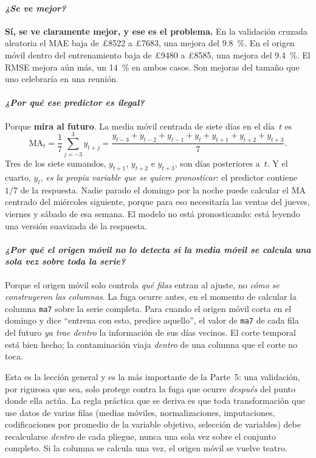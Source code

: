 \documentclass[11pt]{article}
\newcommand{\gbp}{\pounds}
\begin{document}
\paragraph{{\normalfont\itshape ¿Se ve mejor?}} \textbf{S\'i, se ve claramente
mejor, y ese es el problema.} En la validaci\'on cruzada aleatoria el MAE
baja de \gbp\num{8522} a \gbp\num{7683}, una mejora del
\SI{9.8}{\percent}. En el origen m\'ovil dentro del entrenamiento baja de
\gbp\num{9480} a \gbp\num{8585}, una mejora del \SI{9.4}{\percent}. El RMSE
mejora a\'un m\'as, un \SI{14}{\percent} en ambos casos. Son mejoras del
tama\~no que uno celebrar\'ia en una reuni\'on.

\paragraph{{\normalfont\itshape ¿Por qu\'e ese predictor es ilegal?}} Porque
\textbf{mira al futuro}. La media m\'ovil centrada de siete d\'ias en el
d\'ia~$t$ es
\[
\mathrm{MA}_t = \frac{1}{7}\sum_{j=-3}^{3} y_{t+j}
= \frac{y_{t-3}+y_{t-2}+y_{t-1}+y_t+y_{t+1}+y_{t+2}+y_{t+3}}{7}.
\]
Tres de los siete sumandos, $y_{t+1}$, $y_{t+2}$ e $y_{t+3}$, son d\'ias
posteriores a~$t$. Y el cuarto, $y_t$, \emph{es la propia variable que se
quiere pronosticar}: el predictor contiene $1/7$ de la respuesta. Nadie
parado el domingo por la noche puede calcular el $\mathrm{MA}$ centrado del
mi\'ercoles siguiente, porque para eso necesitar\'ia las ventas del jueves,
viernes y s\'abado de esa semana. El modelo no est\'a pronosticando: est\'a
leyendo una versi\'on suavizada de la respuesta.

\paragraph{{\normalfont\itshape ¿Por qu\'e el origen m\'ovil \emph{no} lo
detecta si la media m\'ovil se calcula una sola vez sobre toda la serie?}}
Porque el origen m\'ovil solo controla \emph{qu\'e filas} entran al ajuste,
no \emph{c\'omo se construyeron las columnas}. La fuga ocurre antes, en el
momento de calcular la columna \texttt{ma7} sobre la serie completa. Para
cuando el origen m\'ovil corta en el domingo y dice ``entrena con esto,
predice aquello'', el valor de \texttt{ma7} de cada fila del futuro
\emph{ya trae dentro} la informaci\'on de sus d\'ias vecinos. El corte
temporal est\'a bien hecho; la contaminaci\'on viaja \emph{dentro} de una
columna que el corte no toca.

Esta es la lecci\'on general y es la m\'as importante de la Parte~5: una
validaci\'on, por rigurosa que sea, solo protege contra la fuga que ocurre
\emph{despu\'es} del punto donde ella act\'ua. La regla pr\'actica que se
deriva es que toda transformaci\'on que use datos de varias filas (medias
m\'oviles, normalizaciones, imputaciones, codificaciones por promedio de la
variable objetivo, selecci\'on de variables) debe recalcularse \emph{dentro}
de cada pliegue, nunca una sola vez sobre el conjunto completo. Si la columna
se calcula una vez, el origen m\'ovil se vuelve teatro.
\end{document}
